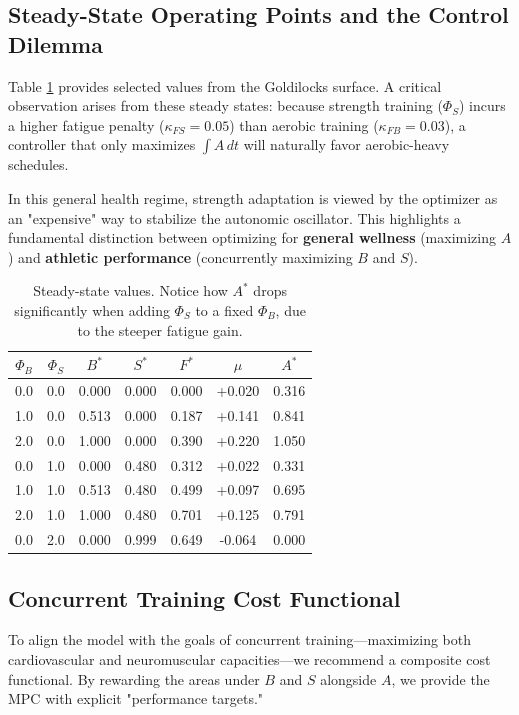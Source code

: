 \subsection{Steady-State Operating Points and the Control Dilemma}

Table \ref{tab:stability_values} provides selected values from the Goldilocks surface. A critical observation arises from these steady states: because strength training ($\Phi_S$) incurs a higher fatigue penalty ($\kappa_{FS} = 0.05$) than aerobic training ($\kappa_{FB} = 0.03$), a controller that only maximizes $\int A \, dt$ will naturally favor aerobic-heavy schedules. 

In this general health regime, strength adaptation is viewed by the optimizer as an "expensive" way to stabilize the autonomic oscillator. This highlights a fundamental distinction between optimizing for \textbf{general wellness} (maximizing $A$) and \textbf{athletic performance} (concurrently maximizing $B$ and $S$).

\begin{table}[h]
\centering
\small
\begin{tabular}{@{}ccccccc@{}}
\toprule
$\Phi_B$ & $\Phi_S$ & $B^*$ & $S^*$ & $F^*$ & $\mu$ & $A^*$ \\
\midrule
0.0 & 0.0 & 0.000 & 0.000 & 0.000 & +0.020 & 0.316 \\
1.0 & 0.0 & 0.513 & 0.000 & 0.187 & +0.141 & 0.841 \\
2.0 & 0.0 & 1.000 & 0.000 & 0.390 & +0.220 & 1.050 \\
0.0 & 1.0 & 0.000 & 0.480 & 0.312 & +0.022 & 0.331 \\
1.0 & 1.0 & 0.513 & 0.480 & 0.499 & +0.097 & 0.695 \\
2.0 & 1.0 & 1.000 & 0.480 & 0.701 & +0.125 & 0.791 \\
0.0 & 2.0 & 0.000 & 0.999 & 0.649 & -0.064 & 0.000 \\
\bottomrule
\end{tabular}
\caption{Steady-state values. Notice how $A^*$ drops significantly when adding $\Phi_S$ to a fixed $\Phi_B$, due to the steeper fatigue gain.}
\label{tab:stability_values}
\end{table}

\subsection{Concurrent Training Cost Functional}

To align the model with the goals of concurrent training—maximizing both cardiovascular and neuromuscular capacities—we recommend a composite cost functional. By rewarding the areas under $B$ and $S$ alongside $A$, we provide the MPC with explicit "performance targets."

